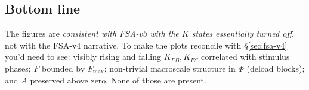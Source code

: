 \subsection{Bottom line}

The figures are \emph{consistent with FSA-v3 with the $K$ states essentially turned off}, not with the FSA-v4 narrative. To make the plots reconcile with \S\ref{sec:fsa-v4} you'd need to see: visibly rising and falling $K_{FB}, K_{FS}$ correlated with stimulus phases; $F$ bounded by $F_{\max}$; non-trivial macroscale structure in $\Phi$ (deload blocks); and $A$ preserved above zero. None of those are present.
